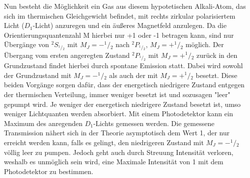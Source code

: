 Nun besteht die Möglichkeit ein Gas aus diesem hypotetischen Alkali-Atom, das sich im thermischen Gleichgewicht befindet,
mit rechts zirkular polarisiertem Licht ($D_1$-Licht) anzuregen und ein äußeres Magnetfeld anzulegen. Da die Orientierungsquantenzahl M hierbei nur +1 oder -1 betragen kann, sind nur Übergänge von ${}^2S_{^1\!/\!_2}$ mit  $M_J=-^1\!/\!_2$ nach ${}^2P_{^1\!/\!_2}$, $M_J=+^1\!/\!_2$ möglich.
Der Übergang vom ersten angeregten Zustand ${}^2P_{^1\!/\!_2}$ mit $M_J=+^1\!/\!_2$ zurück in den Grundzustand findet hierbei durch spontane
Emission statt. Dabei wird sowohl der Grundzustand mit $M_J=-^1\!/\!_2$
als auch der mit $M_J=+^1\!/\!_2$ besetzt. Diese beiden Vorgänge sorgen dafür, dass der energetisch niedrigere Zustand entgegen der thermischen Verteilung, immer weniger besetzt ist und sozusagen "leer" gepumpt wird.
Je weniger der energetisch niedrigere Zustand besetzt ist, umso weniger Lichtquanten werden absorbiert. Mit einem Photodetektor kann ein Maximum des anregenden $D_1$-Lichts gemessen werden. Die gemessene
Transmission nähert sich in der Theorie asymptotisch dem Wert 1, der nur erreicht werden kann, falls es gelingt, den niedrigeren Zustand mit $M_J=-^1\!/\!_2$ völlig leer zu pumpen. Jedoch geht auch durch Streuung Intensität verloren, weshalb es unmöglich sein wird, eine Maximale Intensität von 1 mit dem Photodetektor zu bestimmen.

